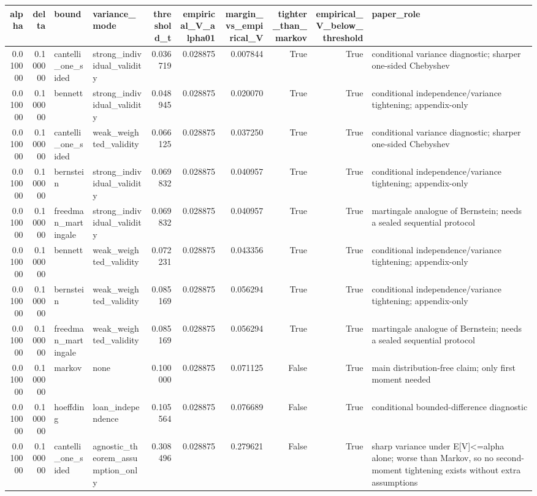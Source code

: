 \begin{tabular}{rrllrrrrrl}
\toprule
alpha & delta & bound & variance\_mode & threshold\_t & empirical\_V\_alpha01 & margin\_vs\_empirical\_V & tighter\_than\_markov & empirical\_V\_below\_threshold & paper\_role \\
\midrule
0.010000 & 0.100000 & cantelli\_one\_sided & strong\_individual\_validity & 0.036719 & 0.028875 & 0.007844 & True & True & conditional variance diagnostic; sharper one-sided Chebyshev \\
0.010000 & 0.100000 & bennett & strong\_individual\_validity & 0.048945 & 0.028875 & 0.020070 & True & True & conditional independence/variance tightening; appendix-only \\
0.010000 & 0.100000 & cantelli\_one\_sided & weak\_weighted\_validity & 0.066125 & 0.028875 & 0.037250 & True & True & conditional variance diagnostic; sharper one-sided Chebyshev \\
0.010000 & 0.100000 & bernstein & strong\_individual\_validity & 0.069832 & 0.028875 & 0.040957 & True & True & conditional independence/variance tightening; appendix-only \\
0.010000 & 0.100000 & freedman\_martingale & strong\_individual\_validity & 0.069832 & 0.028875 & 0.040957 & True & True & martingale analogue of Bernstein; needs a sealed sequential protocol \\
0.010000 & 0.100000 & bennett & weak\_weighted\_validity & 0.072231 & 0.028875 & 0.043356 & True & True & conditional independence/variance tightening; appendix-only \\
0.010000 & 0.100000 & bernstein & weak\_weighted\_validity & 0.085169 & 0.028875 & 0.056294 & True & True & conditional independence/variance tightening; appendix-only \\
0.010000 & 0.100000 & freedman\_martingale & weak\_weighted\_validity & 0.085169 & 0.028875 & 0.056294 & True & True & martingale analogue of Bernstein; needs a sealed sequential protocol \\
0.010000 & 0.100000 & markov & none & 0.100000 & 0.028875 & 0.071125 & False & True & main distribution-free claim; only first moment needed \\
0.010000 & 0.100000 & hoeffding & loan\_independence & 0.105564 & 0.028875 & 0.076689 & False & True & conditional bounded-difference diagnostic \\
0.010000 & 0.100000 & cantelli\_one\_sided & agnostic\_theorem\_assumption\_only & 0.308496 & 0.028875 & 0.279621 & False & True & sharp variance under E[V]<=alpha alone; worse than Markov, so no second-moment tightening exists without extra assumptions \\

\end{tabular}

